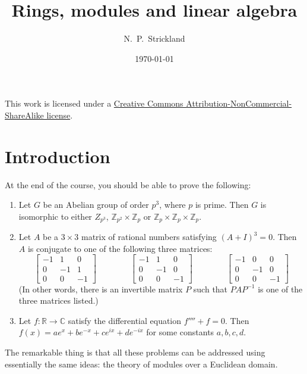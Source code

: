 \documentclass{amsart}
\newcommand{\C}         {{\mathbb{C}}}
\newcommand{\R}         {{\mathbb{R}}}
\newcommand{\Z}         {{\mathbb{Z}}}
\newcommand{\tm}        {\times}
\newcommand{\xra}       {\xrightarrow}
\renewcommand{\:}{\colon}
\theoremstyle{definition}
\begin{document}
\title{Rings, modules and linear algebra}
\author{N.~P.~Strickland}
\date{\today}


\maketitle 

\begin{center}
 This work is licensed under a 
 \href{https://creativecommons.org/licenses/by-nc-sa/3.0/deed.en}{
  Creative Commons Attribution-NonCommercial-ShareAlike license}.
 
 \bigskip

 \doclicenseImage 
\end{center}

\section{Introduction}
\label{sec-intro} 

At the end of the course, you should be able to prove the following:
\begin{enumerate}
\item Let $G$ be an Abelian group of order $p^3$, where $p$ is prime.
 Then $G$ is isomorphic to either $Z_{p^3}$, $\Z_{p^2}\tm\Z_p$ or
 $\Z_p\tm\Z_p\tm\Z_p$.
\item Let $A$ be a $3\tm 3$ matrix of rational numbers satisfying
 $(A+I)^3=0$.  Then $A$ is conjugate to one of the following three
 matrices: 
 \[ \left[\begin{array}{ccc}
      -1 &  1 &  0 \\  0 & -1 &  1 \\  0 &  0 & -1 
    \end{array}\right] \hspace{4em}
    \left[\begin{array}{ccc}
      -1 &  1 &  0 \\  0 & -1 &  0 \\  0 &  0 & -1 
    \end{array}\right] \hspace{4em}
    \left[\begin{array}{ccc}
      -1 &  0 &  0 \\  0 & -1 &  0 \\  0 &  0 & -1 
    \end{array}\right]
 \]
 (In other words, there is an invertible matrix $P$ such that
 $PAP^{-1}$ is one of the three matrices listed.) 
\item Let $f\:\R\xra{}\C$ satisfy the differential equation
 $f''''+f=0$.  Then $f(x)=a e^x + b e^{-x} + c e^{ix} + d e^{-ix}$ for
 some constants $a,b,c,d$.
\end{enumerate}
The remarkable thing is that all these problems can be addressed using
essentially the same ideas: the theory of modules over a Euclidean
domain. 
\end{document}
